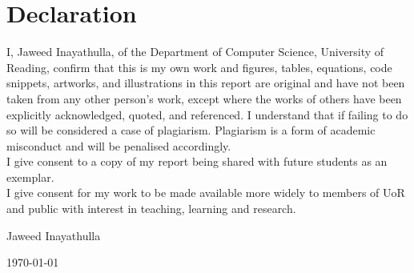 \documentclass[a4paper,11pt,oneside]{book}
\begin{document}
    
    \newpage
    \thispagestyle{empty}
    \chapter*{\Large Declaration}
    I,
     Jaweed Inayathulla, %
    of the Department of Computer Science, University of Reading, confirm that this is my own work and figures, tables, equations, code snippets, artworks, and illustrations in this report are original and have not been taken from any other person's work, except where the works of others have been explicitly acknowledged, quoted, and referenced. I understand that if failing to do so will be considered a case of plagiarism. Plagiarism is a form of academic misconduct and will be penalised accordingly. \\
    
    \noindent
    I give consent to a copy of my report being shared with future students as an exemplar. \\
    
    \noindent
    I give consent for my work to be made available more widely to members of UoR and public with interest in teaching, learning and research. 
    ~\\[1cm]
    \begin{flushright}
	Jaweed Inayathulla %
    
    \today
    \end{flushright}

     
    
\end{document}
